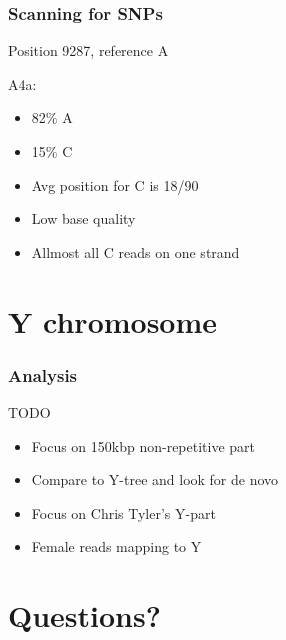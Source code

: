 \documentclass[slidestop,14pt]{beamer}
\begin{document}
\begin{frame}
  \frametitle{Scanning for SNPs}

  \vspace{\baselineskip}

  Position 9287, reference A

  \vspace{\baselineskip}

  A4a:
  \begin{itemize}
    \item 82\% {\color{Green} A}
    \item 15\% {\color{Red} C}
    \item Avg position for {\color{Red} C} is 18/90
    \item Low base quality
    \item Allmost all {\color{Red} C} reads on one strand
  \end{itemize}
\end{frame}

\section{Y chromosome}


\begin{frame}
  \frametitle{Analysis}

  \vspace{\baselineskip}

  TODO

  \vspace{\baselineskip}

  \begin{itemize}
    \item Focus on 150kbp non-repetitive part
    \item Compare to Y-tree and look for de novo
    \item Focus on Chris Tyler's Y-part
    \item Female reads mapping to Y
  \end{itemize}
\end{frame}

\section{Questions?}
\end{document}

